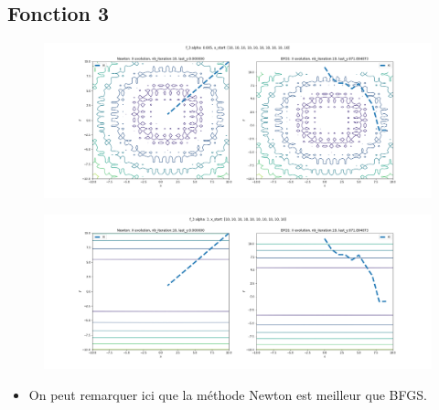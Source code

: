 \documentclass[twoside,10pt,a4paper]{article}
\numberwithin{equation}{section}					%
\numberwithin{figure}{section}						%
\begin{document}
\subsection{Fonction 3 }\label{sec:subsection2}
\begin{figure}[H]
    \centering
    \includegraphics[width=\textwidth]{imgs/comparaison/f_3_a-0.005.png}
    \caption{}
\end{figure}
\begin{figure}[H]
    \centering
    \includegraphics[width=\textwidth]{imgs/comparaison/f_3_a-3.png}
    \caption{}
\end{figure}
\begin{itemize}
	\item On peut remarquer ici que la méthode Newton est meilleur que BFGS.
\end{itemize}
\end{document}
